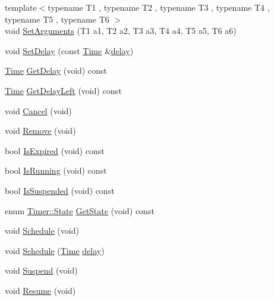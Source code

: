 \begin{DoxyCompactItemize}
\item 
{\footnotesize template$<$typename T1 , typename T2 , typename T3 , typename T4 , typename T5 , typename T6 $>$ }\\void \hyperlink{classns3_1_1Timer_a27aa435490985a39632857742b286c29}{Set\+Arguments} (T1 a1, T2 a2, T3 a3, T4 a4, T5 a5, T6 a6)
\item 
void \hyperlink{classns3_1_1Timer_a02ac85f61e64a2bc3a104914859504c9}{Set\+Delay} (const \hyperlink{classns3_1_1Time}{Time} \&\hyperlink{mmwave_2model_2fading-traces_2fading__trace__generator_8m_a7964e6aa8f61a9d28973c8267a606ad8}{delay})
\item 
\hyperlink{classns3_1_1Time}{Time} \hyperlink{classns3_1_1Timer_a894bb858e0f97b6c879f08f5fb18b474}{Get\+Delay} (void) const 
\item 
\hyperlink{classns3_1_1Time}{Time} \hyperlink{classns3_1_1Timer_a0dc288dd3de21a524d088fc8a5a14a73}{Get\+Delay\+Left} (void) const 
\item 
void \hyperlink{classns3_1_1Timer_ac8261489cfc3361ab869ea2387cfc841}{Cancel} (void)
\item 
void \hyperlink{classns3_1_1Timer_a212c946d8b077413171d019f2adc42b5}{Remove} (void)
\item 
bool \hyperlink{classns3_1_1Timer_ab1de3f9236e67c0d83c061c19c607c6c}{Is\+Expired} (void) const 
\item 
bool \hyperlink{classns3_1_1Timer_addbc6c740f21ddeb6ad358557962b24c}{Is\+Running} (void) const 
\item 
bool \hyperlink{classns3_1_1Timer_a6eaea57766ec5e85023264fe2fb69066}{Is\+Suspended} (void) const 
\item 
enum \hyperlink{classns3_1_1Timer_aa83d09264a6bcc19bfc7831ef315ddf6}{Timer\+::\+State} \hyperlink{classns3_1_1Timer_ad8dbc96d811f55126b76de228d260eab}{Get\+State} (void) const 
\item 
void \hyperlink{classns3_1_1Timer_ac3345d696887578f518b19f359f7f94b}{Schedule} (void)
\item 
void \hyperlink{classns3_1_1Timer_a9ecd4720dd3c082dab33f2d1e066814c}{Schedule} (\hyperlink{classns3_1_1Time}{Time} \hyperlink{mmwave_2model_2fading-traces_2fading__trace__generator_8m_a7964e6aa8f61a9d28973c8267a606ad8}{delay})
\item 
void \hyperlink{classns3_1_1Timer_a168f973f4c60fbeb1580d4734f91e049}{Suspend} (void)
\item 
void \hyperlink{classns3_1_1Timer_ac09edfb12f9b4ef8fe582f1cd210b6fc}{Resume} (void)
\end{DoxyCompactItemize}
